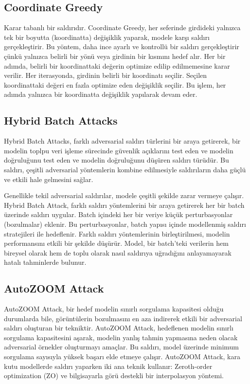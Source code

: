 \newpage

\subsection{Coordinate Greedy}

Karar tabanlı bir saldırıdır. Coordinate Greedy, her seferinde girdideki yalnızca tek bir boyutta (koordinatta) değişiklik yaparak, modele karşı saldırı gerçekleştirir. Bu yöntem, daha ince ayarlı ve kontrollü bir saldırı gerçekleştirir çünkü yalnızca belirli bir yönü veya girdinin bir kısmını hedef alır. Her bir adımda, belirli bir koordinattaki değerin optimize edilip edilmemesine karar verilir. Her iterasyonda, girdinin belirli bir koordinatı seçilir. Seçilen koordinattaki değeri en fazla optimize eden değişiklik seçilir. Bu işlem, her adımda yalnızca bir koordinatta değişiklik yapılarak devam eder.

\newpage

\subsection{Hybrid Batch Attacks}

Hybrid Batch Attacks, farklı adversarial saldırı türlerini bir araya getirerek, bir modelin toplpu veri işleme sürecinde güvenlik açıklarını test eden ve modelin doğruluğunu test eden ve modelin doğruluğunu düşüren saldırı türüdür. Bu saldırı, çeşitli adversarial yöntemlerin kombine edilmesiyle saldırıların daha güçlü ve etkili hale gelmesini sağlar.

Genellikle tekil adversarial saldırılar, modele çeşitli şekilde zarar vermeye çalışır. Hybrid Batch Attack, farklı saldırı yöntemlerini bir araya getirerek her bir batch üzerinde saldırı uygular. Batch içindeki her bir veriye küçük perturbasyonlar (bozulmalar) eklenir. Bu perturbasyonlar, batch yapısı içinde modellenmiş saldırı stratejileri ile hedeflenir. Farklı saldırı yöntemlerinin birleştirilmesi, modelin performansını etkili bir şekilde düşürür. Model, bir batch'teki verilerin hem bireysel olarak hem de toplu olarak nasıl saldırıya uğradığını anlayamayarak hatalı tahminlerde bulunur.

\newpage

\subsection{AutoZOOM Attack}

AutoZOOM Attack, bir hedef modelin sınırlı sorgulama kapasitesi olduğu durumlarda bile, görüntülerin bozulmasını en aza indirerek etkili bir adversarial saldırı oluşturan bir tekniktir. AutoZOOM Attack, hedeflenen modelin sınırlı sorgulama kapasitesini aşarak, modelin yanlış tahmin yapmasına neden olacak adversarial örnekler oluşturmayı amaçlar. Bu saldırı, model üzerinde minimum sorgulama sayısıyla yüksek başarı elde etmeye çalışır. AutoZOOM Attack, kara kutu modellerde saldırı yaparken iki ana teknik kullanır: Zeroth-order optimization (ZO) ve bilgisayarla görü destekli bir interpolasyon yöntemi.

